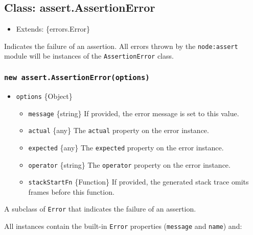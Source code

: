 \subsection{Class:
assert.AssertionError}\label{class-assert.assertionerror}

\begin{itemize}
\tightlist
\item
  Extends: \{errors.Error\}
\end{itemize}

Indicates the failure of an assertion. All errors thrown by the
\texttt{node:assert} module will be instances of the
\texttt{AssertionError} class.

\subsubsection{\texorpdfstring{\texttt{new\ assert.AssertionError(options)}}{new assert.AssertionError(options)}}\label{new-assert.assertionerroroptions}

\begin{itemize}
\tightlist
\item
  \texttt{options} \{Object\}

  \begin{itemize}
  \tightlist
  \item
    \texttt{message} \{string\} If provided, the error message is set to
    this value.
  \item
    \texttt{actual} \{any\} The \texttt{actual} property on the error
    instance.
  \item
    \texttt{expected} \{any\} The \texttt{expected} property on the
    error instance.
  \item
    \texttt{operator} \{string\} The \texttt{operator} property on the
    error instance.
  \item
    \texttt{stackStartFn} \{Function\} If provided, the generated stack
    trace omits frames before this function.
  \end{itemize}
\end{itemize}

A subclass of \texttt{Error} that indicates the failure of an assertion.

All instances contain the built-in \texttt{Error} properties
(\texttt{message} and \texttt{name}) and:

